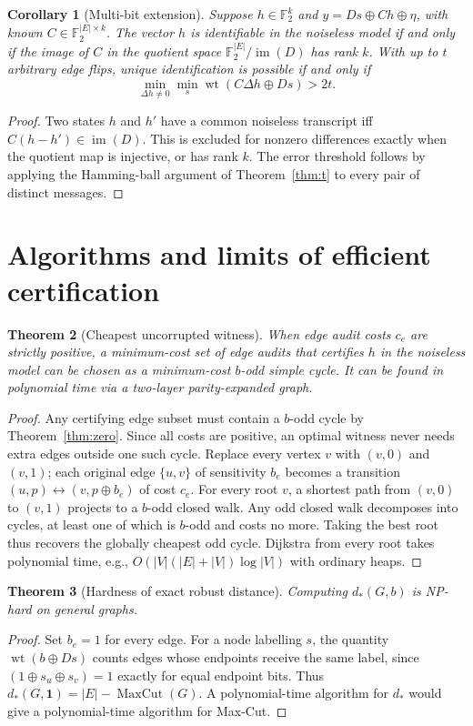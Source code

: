 \documentclass[10pt,a4paper]{article}
\newtheorem{theorem}{Theorem}
\newtheorem{corollary}[theorem]{Corollary}
\theoremstyle{definition}\newtheorem{definition}[theorem]{Definition}
\newcommand{\F}{\mathbb F_2}
\newcommand{\wt}{\operatorname{wt}}
\newcommand{\im}{\operatorname{im}}
\begin{document}
\begin{corollary}[Multi-bit extension]
Suppose $h\in\F^k$ and $y=Ds\oplus Ch\oplus\eta$, with known $C\in\F^{|E|\times k}$. The vector $h$ is identifiable in the noiseless model if and only if the image of $C$ in the quotient space $\F^{|E|}/\im(D)$ has rank $k$. With up to $t$ arbitrary edge flips, unique identification is possible if and only if
\[
 \min_{\Delta h\ne0}\min_{s}\wt(C\Delta h\oplus Ds)>2t.
\]
\end{corollary}
\begin{proof}
Two states $h$ and $h'$ have a common noiseless transcript iff $C(h-h')\in\im(D)$. This is excluded for nonzero differences exactly when the quotient map is injective, or has rank $k$. The error threshold follows by applying the Hamming-ball argument of Theorem~\ref{thm:t} to every pair of distinct messages.
\end{proof}

\section{Algorithms and limits of efficient certification}
\begin{theorem}[Cheapest uncorrupted witness]
When edge audit costs $c_e$ are strictly positive, a minimum-cost set of edge audits that certifies $h$ in the noiseless model can be chosen as a minimum-cost $b$-odd simple cycle. It can be found in polynomial time via a two-layer parity-expanded graph.
\end{theorem}
\begin{proof}
Any certifying edge subset must contain a $b$-odd cycle by Theorem~\ref{thm:zero}. Since all costs are positive, an optimal witness never needs extra edges outside one such cycle. Replace every vertex $v$ with $(v,0)$ and $(v,1)$; each original edge $\{u,v\}$ of sensitivity $b_e$ becomes a transition $(u,p)\leftrightarrow(v,p\oplus b_e)$ of cost $c_e$. For every root $v$, a shortest path from $(v,0)$ to $(v,1)$ projects to a $b$-odd closed walk. Any odd closed walk decomposes into cycles, at least one of which is $b$-odd and costs no more. Taking the best root thus recovers the globally cheapest odd cycle. Dijkstra from every root takes polynomial time, e.g., $O(|V|(|E|+|V|)\log |V|)$ with ordinary heaps.
\end{proof}

\begin{theorem}[Hardness of exact robust distance]
Computing $d_*(G,b)$ is NP-hard on general graphs.
\end{theorem}
\begin{proof}
Set $b_e=1$ for every edge. For a node labelling $s$, the quantity $\wt(b\oplus Ds)$ counts edges whose endpoints receive the same label, since $(1\oplus s_u\oplus s_v)=1$ exactly for equal endpoint bits. Thus $d_*(G,\mathbf1)=|E|-\operatorname{MaxCut}(G)$. A polynomial-time algorithm for $d_*$ would give a polynomial-time algorithm for Max-Cut.
\end{proof}
\end{document}

